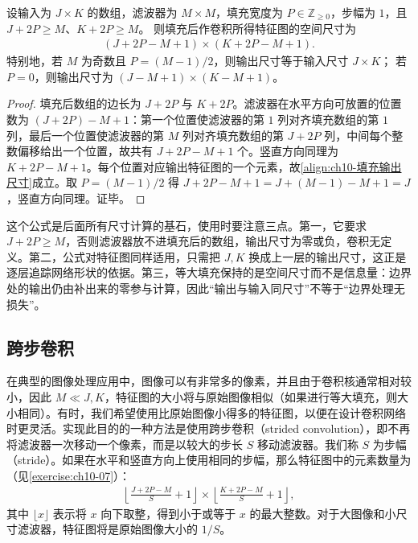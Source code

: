 \documentclass[../../main.tex]{subfiles}
\begin{document}
\begin{proposition}[填充卷积的输出尺寸]\label{proposition:ch10-填充输出尺寸}
设输入为 $J\times K$ 的数组，滤波器为 $M\times M$，填充宽度为
$P\in\mathbb{Z}_{\geqslant0}$，步幅为 $1$，且 $J+2P\geqslant M$、$K+2P\geqslant M$。
则填充后作卷积所得特征图的空间尺寸为
\begin{align}
  (J+2P-M+1)\times(K+2P-M+1).
  \label{align:ch10-填充输出尺寸}
\end{align}
特别地，若 $M$ 为奇数且 $P=(M-1)/2$，则输出尺寸等于输入尺寸 $J\times K$；
若 $P=0$，则输出尺寸为 $(J-M+1)\times(K-M+1)$。
\end{proposition}
\begin{proof}
填充后数组的边长为 $J+2P$ 与 $K+2P$。滤波器在水平方向可放置的位置数为 $(J+2P)-M+1$：第一个位置使滤波器的第 $1$ 列对齐填充数组的第 $1$ 列，最后一个位置使滤波器的第 $M$ 列对齐填充数组的第 $J+2P$ 列，中间每个整数偏移给出一个位置，故共有 $J+2P-M+1$ 个。竖直方向同理为 $K+2P-M+1$。每个位置对应输出特征图的一个元素，故\eqref{align:ch10-填充输出尺寸}成立。取 $P=(M-1)/2$ 得 $J+2P-M+1=J+(M-1)-M+1=J$，竖直方向同理。证毕。
\end{proof}

\begin{remark}
这个公式是后面所有尺寸计算的基石，使用时要注意三点。第一，它要求 $J+2P\geqslant M$，否则滤波器放不进填充后的数组，输出尺寸为零或负，卷积无定义。第二，公式对特征图同样适用，只需把 $J,K$ 换成上一层的输出尺寸，这正是逐层追踪网络形状的依据。第三，等大填充保持的是空间尺寸而不是信息量：边界处的输出仍由补出来的零参与计算，因此“输出与输入同尺寸”不等于“边界处理无损失”。
\end{remark}

\subsection{跨步卷积}\label{subsection:ch10-跨步卷积}

在典型的图像处理应用中，图像可以有非常多的像素，并且由于卷积核通常相对较小，因此 $M\ll J,K$，特征图的大小将与原始图像相似（如果进行等大填充，则大小相同）。有时，我们希望使用比原始图像小得多的特征图，以便在设计卷积网络时更灵活。实现此目的的一种方法是使用跨步卷积（strided convolution），即不再将滤波器一次移动一个像素，而是以较大的步长 $S$ 移动滤波器。我们称 $S$ 为步幅（stride）。如果在水平和竖直方向上使用相同的步幅，那么特征图中的元素数量为（见\cref{exercise:ch10-07}）：
\begin{align}
  \left\lfloor \frac{J+2P-M}{S}+1\right\rfloor
  \times
  \left\lfloor \frac{K+2P-M}{S}+1\right\rfloor,
  \label{align:ch10-跨步卷积输出尺寸}
\end{align}
其中 $\lfloor x\rfloor$ 表示将 $x$ 向下取整，得到小于或等于 $x$ 的最大整数。对于大图像和小尺寸滤波器，特征图将是原始图像大小的 $1/S$。
\end{document}
